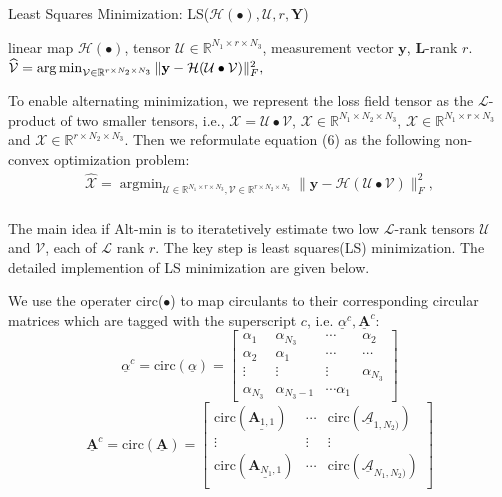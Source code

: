 \documentclass[journal,article,submit,moreauthors,pdftex,10pt,a4paper]{Definitions/mdpi}
\theoremstyle{plain}
\theoremstyle{definition}
\theoremstyle{remark}
\begin{document}
\begin{algorithm}[htb]
    \caption{Least Squares Minimization: LS($\mathcal{H}(\bullet), \mathcal{U}, r, \mathbf{Y}$)}
    \label{alg:LS}
    \begin{algorithmic}[2]
        \Require
        linear map $\mathcal{H}(\bullet)$, tensor $\mathcal{U} \in \mathbb{R}^{N_1\times r \times N_3}$, measurement vector $\mathbf{y}$, $\mathbf{L}$-rank $r$.
    $\widehat{\mathcal{V}} =
    \mathop{\arg\min}_{ \mathcal{V} \in \mathbb{R}^{r \times N_2 \times N_3}}\| \mathbf{y} - \mathcal{H}(\mathcal{U} \bullet \mathcal{V}) \|_F^2 , \\$
    \end{algorithmic}
\end{algorithm}
To enable alternating minimization, we represent the loss field tensor as the $\mathcal{L}$-product of two smaller tensors, i.e., $\mathcal{X} = \mathcal{U} \bullet \mathcal{V}$, $\mathcal{X} \in \mathbb{R}^{N_1 \times N_2 \times N_3}$, $\mathcal{X} \in \mathbb{R}^{N_1 \times r \times N_3}$ and $\mathcal{X} \in \mathbb{R}^{r \times N_2 \times N_3}$.
Then we reformulate equation (6) as the following non-convex optimization problem:
\begin{eqnarray*}
    \widehat{\mathcal{X}} =
    \mathop{\arg\min}_{ \mathcal{U} \in \mathbb{R}^{N_1 \times r \times N_3}, \mathcal{V} \in \mathbb{R}^{r \times N_2 \times N_3}}\| \mathbf{y} - \mathcal{H}(\mathcal{U} \bullet \mathcal{V}) \|_F^2 , \\
\end{eqnarray*}

The main idea if Alt-min is to iteratetively estimate two low $\mathcal{L}$-rank tensors $\mathcal{U}$ and $\mathcal{V}$, each of $\mathcal{L}$ rank $r$. The key step is least 
squares(LS) minimization. The detailed implemention of LS minimization are given below.

We use the operater circ($\bullet$) to map circulants to their corresponding circular matrices which are tagged with the superscript $c$, i.e. $\underline{\alpha}^c, \underline{\mathbf{A}}^c$:
\[
    \underline{\alpha}^c = \text{circ}(\underline{\alpha}) = \begin{bmatrix}
        \alpha_1 & \alpha_{N_3} & \cdots  & \alpha_2 \\
        \alpha_2 & \alpha_1 & \cdots & \cdots \\
        \vdots & \vdots & \vdots & \alpha_{N_3} \\
        \alpha_{N_3} & \alpha_{N_3-1} & \cdots \alpha_1
    \end{bmatrix}
    \]
    \[
        \underline{\mathbf{A}}^c = \text{circ}(\underline{\mathbf{A}}) = \begin{bmatrix}
            \text{circ}(\underline{\mathbf{A}_{1,1}})  & \cdots & \text{circ}(\underline{\mathcal{A}}_{1,N_2)}) \\
            \vdots & \vdots & \vdots \\
            \text{circ}(\underline{\mathbf{A}_{N_1,1}})  & \cdots & \text{circ}(\underline{\mathcal{A}}_{N_1,N_2)}) \\
        \end{bmatrix}
        \]
\end{document}
